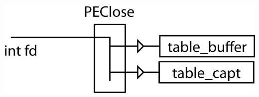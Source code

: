 \documentclass[11pt, a4paper]{article}
\begin{document}
\includegraphics{ressources/close.png}
\end{document}
